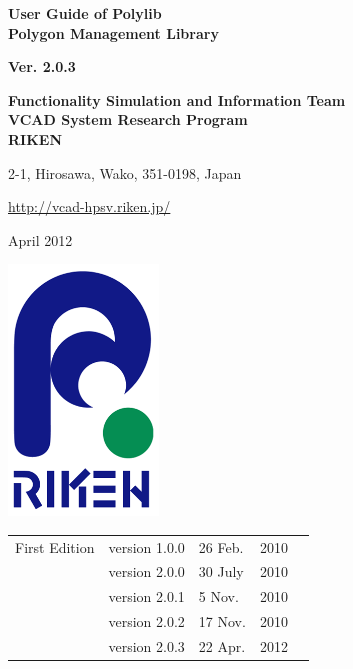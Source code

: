 \documentclass[a4paper,10pt,oneside,fleqn]{jsbook}
\begin{document}
\begin{titlepage}
\begin{center}
\vspace*{3cm}
{\huge \textbf{User Guide of Polylib}}\\
\vspace{5mm}
{\large \textbf{Polygon Management Library}}\\
\vspace{1cm}

{\large \textbf{Ver. 2.0.3}}\\
\vspace{1.5cm}

{\large \textbf{Functionality Simulation and Information Team}\\
\large \textbf{VCAD System Research Program}\\
\large \textbf{RIKEN}\\
\vspace{1cm}
}

{\large 2-1, Hirosawa, Wako, 351-0198, Japan}\\
\vspace{0.5cm}

\url{http://vcad-hpsv.riken.jp/}\\
\vspace{1cm}

April 2012\\
\vspace{4cm}

\includegraphics[width=4cm,bb=-80 0 220 500]{RIKEN_logo_300x500.png}

\end{center}
\end{titlepage}
\newpage

%
\frontmatter

\begin{tabular}{llllr}
First Edition  &  version 1.0.0  & 26 Feb.  & 2010\\
               &  version 2.0.0  & 30 July  & 2010\\
               &  version 2.0.1  &  5 Nov.  & 2010\\
               &  version 2.0.2  & 17 Nov.  & 2010\\
               &  version 2.0.3  & 22 Apr.  & 2012

\end{tabular}
\end{document}
